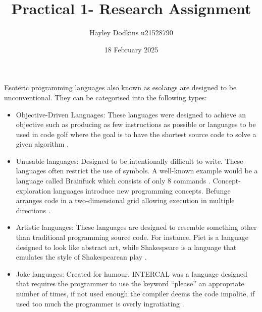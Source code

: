 \documentclass{article}
\title{Practical 1- Research Assignment}
\author{Hayley Dodkins u21528790}
\date{18 February 2025}
\begin{document}
\maketitle

\section{}
Esoteric programming languages also known as esolangs are designed to be unconventional. They can be categorised into the following types: 
\begin{itemize}
    \item Objective-Driven Languages: These languages were designed to achieve an objective such as producing as few instructions as possible or languages to be used in code golf where the goal is to have the shortest source code to solve a given algorithm \cite{Tomassetti, Stuart}.
\end{itemize}
\begin{itemize}
    \item Unusable languages: Designed to be intentionally difficult to write. These languages often restrict the use of symbols. A well-known example would be a language called Brainfuck which consists of only 8 commands \cite{Tomassetti}.
Concept-exploration languages introduce new programming concepts. Befunge arranges code in a two-dimensional grid allowing execution in multiple directions \cite{Tomassetti}.
\end{itemize}
\begin{itemize}
    \item Artistic languages: These languages are designed to resemble something other than traditional programming source code. For instance, Piet is a language designed to look like abstract art, while Shakespeare is a language that emulates the style of Shakespearean play \cite{Stuart}.
\end{itemize}
\begin{itemize}
    \item Joke languages: Created for humour. INTERCAL was a language designed that requires the programmer to use the keyword “please” an appropriate number of times, if not used enough the compiler deems the code impolite, if used too much the programmer is overly ingratiating \cite{Elvis}.
\end{itemize}

\section{}
\end{document}
